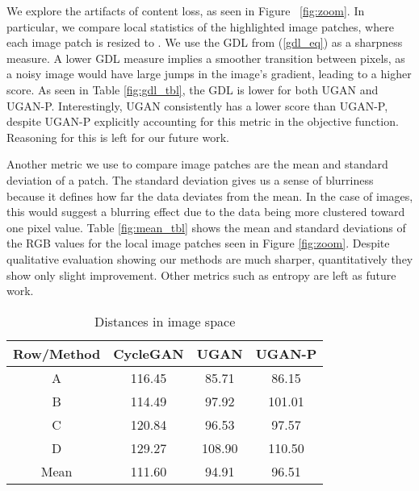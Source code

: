 We explore the artifacts of content loss, as seen in Figure ~\ref{fig:zoom}. In particular, we compare local statistics of the 
highlighted image patches, where each image patch is resized to . We use the GDL \cite{mathieu2015deep} from 
(\ref{gdl_eq}) as a sharpness measure. A lower GDL measure implies a smoother transition between pixels, as a noisy image would 
have large jumps in the image's gradient, leading to a higher score. As seen in Table \ref{fig:gdl_tbl}, the GDL is lower for both UGAN and UGAN-P. 
Interestingly, UGAN consistently has a lower score than UGAN-P, despite UGAN-P explicitly accounting for this metric in the 
objective function. Reasoning for this is left for our future work.

Another metric we use to compare image patches are the mean and standard deviation of a patch. The standard deviation gives us a 
sense of blurriness because it defines how far the data deviates from the mean. In 
the case of images, this would suggest a blurring effect due to the data being more clustered toward one pixel value. Table 
\ref{fig:mean_tbl} shows the mean and standard deviations of the RGB values for the local image patches seen in Figure 
\ref{fig:zoom}. Despite qualitative evaluation showing our methods are much sharper, quantitatively they show only slight 
improvement. Other metrics such as entropy are left as future work.

\begin{table}
\centering
\footnotesize
\caption{Distances in image space}
\begin{tabular}{| c | c | c | c |}
   \hline
   Row/Method & CycleGAN & \textbf{UGAN} & \textbf{UGAN-P} \\ \hline
   A          & 116.45 & 85.71  & 86.15  \\ \hline
   B          & 114.49 & 97.92  & 101.01 \\ \hline
   C          & 120.84 & 96.53  & 97.57  \\ \hline
   D          & 129.27 & 108.90 & 110.50 \\ \hline
   Mean       & 111.60 & 94.91  & 96.51 \\ \hline
\end{tabular}
\label{tab:one}
\end{table}

